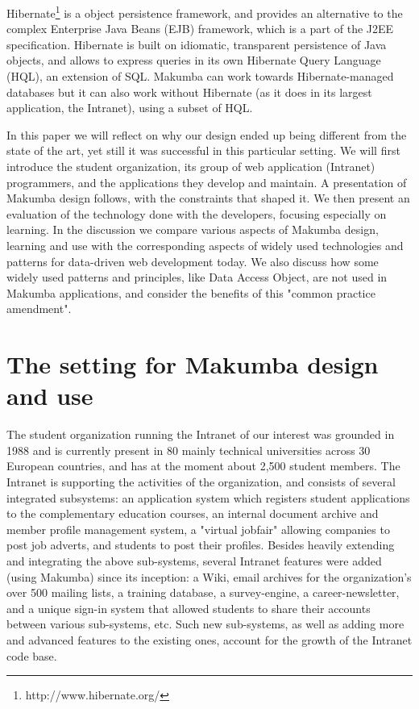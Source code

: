 \documentclass{chi2009}
\begin{document}
Hibernate\footnote{http://www.hibernate.org/} is a object persistence framework, and provides an alternative to the complex Enterprise Java Beans (EJB) framework, which is a part of the J2EE specification. Hibernate is built on idiomatic, transparent persistence of Java objects, and allows to express queries in its own Hibernate Query Language (HQL), an extension of SQL. Makumba can work towards Hibernate-managed databases but it can also work without Hibernate (as it does in its largest application, the Intranet), using a subset of HQL.


In this paper we will  reflect on why our design ended up being different from the state of the art, yet still it was successful in this particular setting. We will first introduce the student organization, its group of web application (Intranet) programmers, and the applications they develop and maintain. A presentation of Makumba design follows, with the constraints that shaped it. We then present an evaluation of the technology done with the developers, focusing especially on learning. In the discussion we compare various aspects of Makumba design, learning and use with the corresponding aspects of widely used technologies and patterns for data-driven web development today. We also discuss how some widely used patterns and principles, like Data Access Object, are not used in Makumba applications, and consider the benefits of this "common practice amendment".

\section{The setting for Makumba design and use}\label{sec:setting}
The student organization running the Intranet of our interest was grounded in 1988 and is currently present in 80 mainly technical universities across 30 European countries, and has at the moment about 2,500 student members. The Intranet is supporting the activities of the organization, and consists of several integrated subsystems: an application system which registers student applications to the complementary education courses, an internal document archive and member profile management system, a "virtual jobfair" allowing companies to post job adverts, and students to post their profiles. Besides heavily extending and integrating the above sub-systems, several Intranet features were added (using Makumba) since its inception: a Wiki, email archives for the organization's over 500 mailing lists, a training database, a survey-engine, a career-newsletter, and a unique sign-in system that allowed students to share their accounts between various sub-systems, etc. Such new sub-systems, as well as adding more and advanced features to the existing ones, account for the growth of the Intranet code base.
\end{document}
